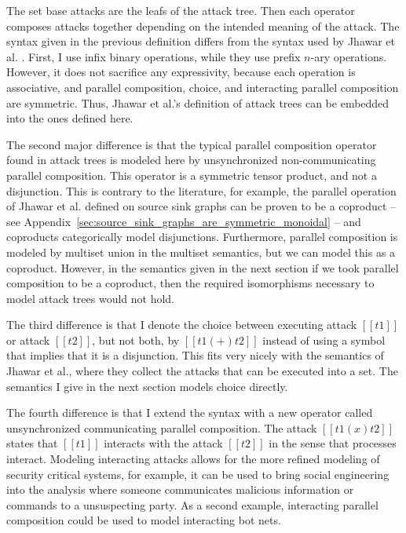 \documentclass{llncs}
\begin{document}
The set base attacks are the leafs of the attack tree.  Then each
operator composes attacks together depending on the intended meaning
of the attack. The syntax given in the previous definition differs
from the syntax used by Jhawar et al. \cite{Jhawar:2015}.  First, I
use infix binary operations, while they use prefix $n$-ary
operations. However, it does not sacrifice any expressivity, because
each operation is associative, and parallel composition, choice, and
interacting parallel composition are symmetric.  Thus, Jhawar et al.'s
definition of attack trees can be embedded into the ones defined
here.%

The second major difference is that the typical parallel composition
operator found in attack trees is modeled here by unsynchronized
non-communicating parallel composition.  This operator is a symmetric
tensor product, and not a disjunction.  This is contrary to the
literature, for example, the parallel operation of Jhawar et
al. defined on source sink graphs \cite{Jhawar:2015} can be proven to
be a coproduct -- see
Appendix~\ref{sec:source_sink_graphs_are_symmetric_monoidal} -- and
coproducts categorically model disjunctions.  Furthermore, parallel
composition is modeled by multiset union in the multiset semantics,
but we can model this as a coproduct.  However, in the semantics given
in the next section if we took parallel composition to be a coproduct,
then the required isomorphisms necessary to model attack trees would
not hold.

The third difference is that I denote the choice between executing
attack $[[t1]]$ or attack $[[t2]]$, but not both, by $[[t1 (+) t2]]$
instead of using a symbol that implies that it is a disjunction.  This
fits very nicely with the semantics of Jhawar et al., where they
collect the attacks that can be executed into a set.  The semantics I
give in the next section models choice directly.

The fourth difference is that I extend the syntax with a new operator
called unsynchronized communicating parallel composition.  The attack
$[[t1 (x) t2]]$ states that $[[t1]]$ interacts with the attack
$[[t2]]$ in the sense that processes interact.  Modeling interacting
attacks allows for the more refined modeling of security critical
systems, for example, it can be used to bring social engineering into
the analysis where someone communicates malicious information or
commands to a unsuspecting party.  As a second example, interacting
parallel composition could be used to model interacting bot nets.
\end{document}
